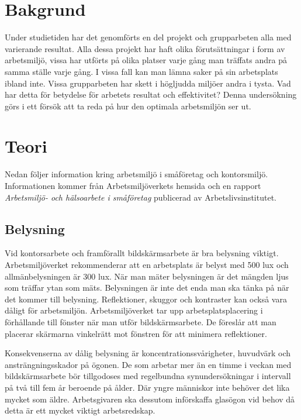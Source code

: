 \section{Bakgrund}
\label{sec:background-hampus}

Under studietiden har det genomförts en del projekt och grupparbeten alla med varierande resultat. Alla dessa projekt har haft olika förutsättningar i form av arbetsmiljö, vissa har utförts på olika platser varje gång man träffats andra på samma ställe varje gång. I vissa fall kan man lämna saker på sin arbetsplats ibland inte. Vissa grupparbeten har skett i högljudda miljöer andra i tysta. Vad har detta för betydelse för arbetets resultat och effektivitet? Denna undersökning görs i ett försök att ta reda på hur den optimala arbetsmiljön ser ut. 

\section{Teori}
\label{sec:theory-hampus}
Nedan följer information kring arbetsmiljö i småföretag och kontorsmiljö. Informationen kommer från Arbetsmiljöverkets hemsida och en rapport \textit{Arbetsmiljö- och hälsoarbete i småföretag} publicerad av Arbetslivsinstitutet.\cite{AV}\cite{smaforetag}

\subsection{Belysning}
Vid kontorsarbete och framförallt bildskärmsarbete är bra belysning viktigt. Arbetsmiljöverket rekommenderar att en arbetsplats är belyst med 500 lux och allmänbelysningen är 300 lux. När man mäter belysningen är det mängden ljus som träffar ytan som mäts. Belysningen är inte det enda man ska tänka på när det kommer till belysning. Reflektioner, skuggor och kontraster kan också vara dåligt för arbetsmiljön. Arbetsmiljöverket tar upp arbetsplatsplacering i förhållande till fönster när man utför bildskärmsarbete. De föreslår att man placerar skärmarna vinkelrätt mot fönstren för att minimera reflektioner. \cite{AVLjus}\cite{AVDator}

Konsekvenserna av dålig belysning är koncentrationssvårigheter, huvudvärk och ansträngningsskador på ögonen. De som arbetar mer än en timme i veckan med bildskärmsarbete bör tillgodoses med regelbundna synundersökningar i intervall på två till fem år beroende på ålder. Där yngre människor inte behöver det lika mycket som äldre. Arbetsgivaren ska dessutom införskaffa glasögon vid behov då detta är ett mycket viktigt arbetsredskap.\cite{AVLjus}

